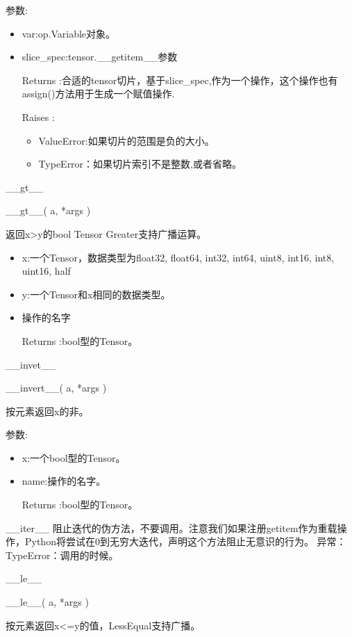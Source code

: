 参数:
\begin{itemize}
	\item var:op.Variable对象。
	\item slice\_spec:tensor.\_\_getitem\_\_参数
	\item[Returns]:合适的tensor切片，基于slice\_spec,作为一个操作，这个操作也有assign()方法用于生成一个赋值操作.
	\item[Raises]:
	\begin{itemize}
		\item ValueError:如果切片的范围是负的大小。
		\item TypeError：如果切片索引不是整数,或者省略。
	\end{itemize}
\end{itemize}
\_\_gt\_\_\newline
\begin{python}
__gt__(
    a,
    *args
)
\end{python}
返回x>y的bool Tensor Greater支持广播运算。
\begin{itemize}
	\item x:一个Tensor，数据类型为float32, float64, int32, int64, uint8, int16, int8, uint16, half
	\item y:一个Tensor和x相同的数据类型。
	\item 操作的名字
	\item[Returns]:bool型的Tensor。
\end{itemize}

\_\_invet\_\_\newline
\begin{python}
__invert__(
    a,
    *args
)
\end{python}
按元素返回x的非。

参数:
\begin{itemize}
\item x:一个bool型的Tensor。
\item name:操作的名字。
\item[Returns]:bool型的Tensor。
\end{itemize}

\_\_iter\_\_\newline
阻止迭代的伪方法，不要调用。注意我们如果注册getitem作为重载操作，Python将尝试在0到无穷大迭代，声明这个方法阻止无意识的行为。
异常：TypeError：调用的时候。

\_\_le\_\_\newline
\begin{python}
__le__(
    a,
    *args
)
\end{python}
按元素返回x<=y的值，LessEqual支持广播。

